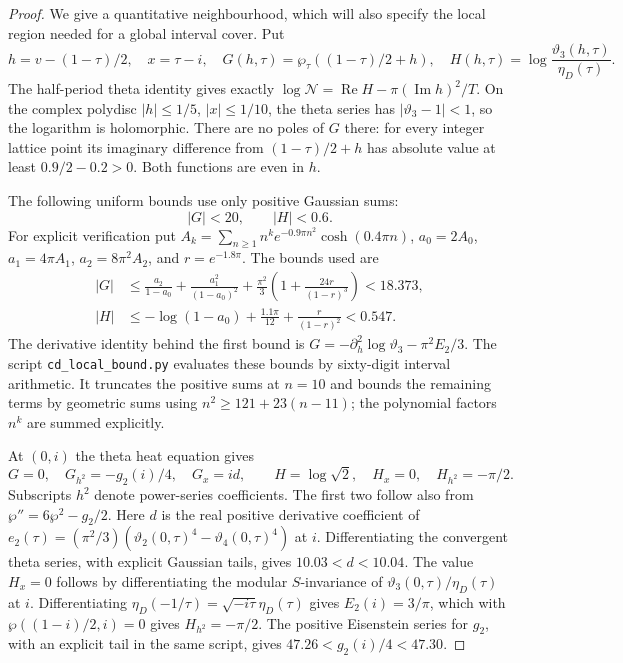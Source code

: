 \begin{proof}
We give a quantitative neighbourhood, which will also specify the local
region needed for a global interval cover. Put
\[
 h=v-(1-\tau)/2,\quad x=\tau-i,\quad
 G(h,\tau)=\wp_\tau((1-\tau)/2+h),\quad
 H(h,\tau)=\log\frac{\vartheta_3(h,\tau)}{\eta_D(\tau)}.
\]
The half-period theta identity gives exactly
$\log\mathcal N=\operatorname{Re}H-\pi(\operatorname{Im}h)^2/T$.
On the complex polydisc $|h|\leq1/5$, $|x|\leq1/10$, the theta series
has $|\vartheta_3-1|<1$, so the logarithm is holomorphic. There are no
poles of $G$ there: for every integer lattice point its imaginary
difference from $(1-\tau)/2+h$ has absolute value at least
$0.9/2-0.2>0$. Both functions are even in $h$.

The following uniform bounds use only positive Gaussian sums:
\[
 |G|<20,\qquad |H|<0.6.
\]
For explicit verification put
$A_k=\sum_{n\geq1}n^k e^{-0.9\pi n^2}\cosh(0.4\pi n)$,
$a_0=2A_0$, $a_1=4\pi A_1$, $a_2=8\pi^2A_2$, and $r=e^{-1.8\pi}$.
The bounds used are
\[
 \begin{aligned}
 |G|&\leq\frac{a_2}{1-a_0}+\frac{a_1^2}{(1-a_0)^2}
 +\frac{\pi^2}3\left(1+\frac{24r}{(1-r)^3}\right)<18.373,\\
 |H|&\leq-\log(1-a_0)+\frac{1.1\pi}{12}+
 \frac r{(1-r)^2}<0.547.
 \end{aligned}
\]
The derivative identity behind the first bound is
$G=-\partial_h^2\log\vartheta_3-\pi^2E_2/3$.
The script \texttt{cd\_local\_bound.py} evaluates these bounds by sixty-digit
interval arithmetic. It truncates the positive sums at $n=10$ and bounds
the remaining terms by geometric sums using
$n^2\geq121+23(n-11)$; the polynomial factors $n^k$ are summed explicitly.

At $(0,i)$ the theta heat equation gives
\[
 G=0,\quad G_{h^2}=-g_2(i)/4,\quad G_x=id,
 \qquad H=\log\sqrt2,\quad H_x=0,\quad H_{h^2}=-\pi/2.
\]
Subscripts $h^2$ denote power-series coefficients. The first two follow
also from $\wp''=6\wp^2-g_2/2$. Here $d$ is the real positive derivative coefficient of
$e_2(\tau)=(\pi^2/3)(\vartheta_2(0,\tau)^4-
\vartheta_4(0,\tau)^4)$ at $i$. Differentiating the convergent theta
series, with explicit Gaussian tails, gives $10.03<d<10.04$.
The value $H_x=0$ follows by differentiating the modular $S$-invariance
of $\vartheta_3(0,\tau)/\eta_D(\tau)$ at $i$. Differentiating
$\eta_D(-1/\tau)=\sqrt{-i\tau}\eta_D(\tau)$ gives $E_2(i)=3/\pi$,
which with $\wp((1-i)/2,i)=0$ gives $H_{h^2}=-\pi/2$.
The positive Eisenstein series for $g_2$, with an explicit tail in the
same script, gives $47.26<g_2(i)/4<47.30$.


\end{proof}
